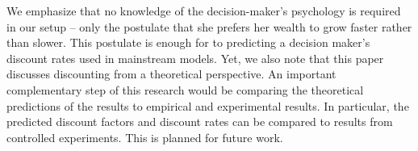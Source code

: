 \documentclass[11pt]{article}
\numberwithin{equation}{section}
\begin{document}
We emphasize that no knowledge of the decision-maker's psychology is required in our setup -- only the postulate that she prefers her wealth to grow faster rather than slower. This postulate is enough for to predicting a decision maker's discount rates used in mainstream models. Yet, we also note that this paper discusses discounting from a theoretical perspective. An important complementary step of this research would be comparing the theoretical predictions of the results to empirical and experimental results. In particular, the predicted discount factors and discount rates can be compared to results from controlled experiments. This is planned for future work.





\end{document}
